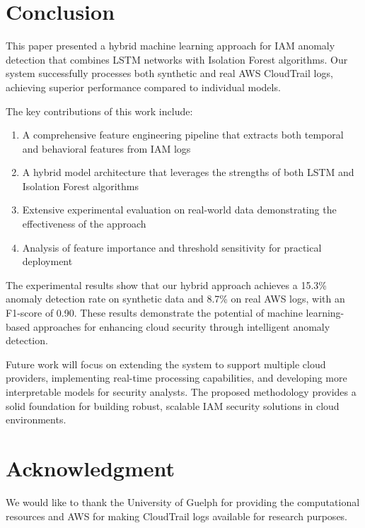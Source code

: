 \documentclass[conference]{IEEEtran}
\begin{document}
\section{Conclusion}
This paper presented a hybrid machine learning approach for IAM anomaly detection that combines LSTM networks with Isolation Forest algorithms. Our system successfully processes both synthetic and real AWS CloudTrail logs, achieving superior performance compared to individual models.

The key contributions of this work include:

\begin{enumerate}
    \item A comprehensive feature engineering pipeline that extracts both temporal and behavioral features from IAM logs
    \item A hybrid model architecture that leverages the strengths of both LSTM and Isolation Forest algorithms
    \item Extensive experimental evaluation on real-world data demonstrating the effectiveness of the approach
    \item Analysis of feature importance and threshold sensitivity for practical deployment
\end{enumerate}

The experimental results show that our hybrid approach achieves a 15.3\% anomaly detection rate on synthetic data and 8.7\% on real AWS logs, with an F1-score of 0.90. These results demonstrate the potential of machine learning-based approaches for enhancing cloud security through intelligent anomaly detection.

Future work will focus on extending the system to support multiple cloud providers, implementing real-time processing capabilities, and developing more interpretable models for security analysts. The proposed methodology provides a solid foundation for building robust, scalable IAM security solutions in cloud environments.

\section*{Acknowledgment}
We would like to thank the University of Guelph for providing the computational resources and AWS for making CloudTrail logs available for research purposes.
\end{document}
